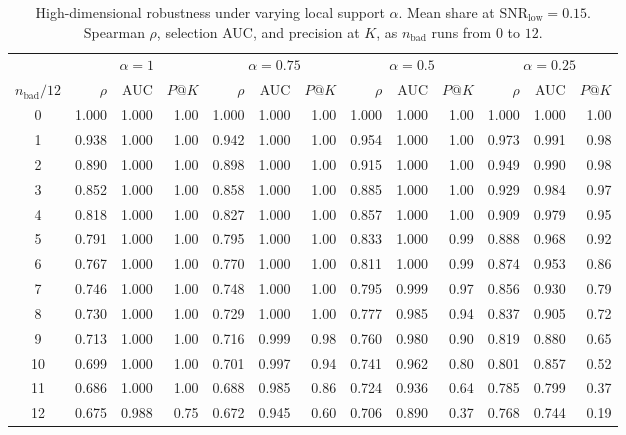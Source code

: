 \begin{table}[t]
\centering
\caption{High-dimensional robustness under varying local support \(\alpha\).
Mean share at \(\mathrm{SNR}_{\mathrm{low}}=0.15\).
Spearman \(\rho\), selection AUC, and precision at \(K\), as
\(n_{\mathrm{bad}}\) runs from \(0\) to \(12\).}
\label{tab:federated_highdim}
\footnotesize
\setlength{\tabcolsep}{3pt}
\begin{tabular}{c rrr rrr rrr rrr}
\toprule
 & \multicolumn{3}{c}{\(\alpha = 1\)} & \multicolumn{3}{c}{\(\alpha = 0.75\)} & \multicolumn{3}{c}{\(\alpha = 0.5\)} & \multicolumn{3}{c}{\(\alpha = 0.25\)} \\
\cmidrule(lr){2-4} \cmidrule(lr){5-7} \cmidrule(lr){8-10} \cmidrule(lr){11-13}
\(n_{\mathrm{bad}}/12\) & \(\rho\) & AUC & \(P@K\) & \(\rho\) & AUC & \(P@K\) & \(\rho\) & AUC & \(P@K\) & \(\rho\) & AUC & \(P@K\) \\
\midrule
0  & 1.000 & 1.000 & 1.00 & 1.000 & 1.000 & 1.00 & 1.000 & 1.000 & 1.00 & 1.000 & 1.000 & 1.00 \\
1  & 0.938 & 1.000 & 1.00 & 0.942 & 1.000 & 1.00 & 0.954 & 1.000 & 1.00 & 0.973 & 0.991 & 0.98 \\
2  & 0.890 & 1.000 & 1.00 & 0.898 & 1.000 & 1.00 & 0.915 & 1.000 & 1.00 & 0.949 & 0.990 & 0.98 \\
3  & 0.852 & 1.000 & 1.00 & 0.858 & 1.000 & 1.00 & 0.885 & 1.000 & 1.00 & 0.929 & 0.984 & 0.97 \\
4  & 0.818 & 1.000 & 1.00 & 0.827 & 1.000 & 1.00 & 0.857 & 1.000 & 1.00 & 0.909 & 0.979 & 0.95 \\
5  & 0.791 & 1.000 & 1.00 & 0.795 & 1.000 & 1.00 & 0.833 & 1.000 & 0.99 & 0.888 & 0.968 & 0.92 \\
6  & 0.767 & 1.000 & 1.00 & 0.770 & 1.000 & 1.00 & 0.811 & 1.000 & 0.99 & 0.874 & 0.953 & 0.86 \\
7  & 0.746 & 1.000 & 1.00 & 0.748 & 1.000 & 1.00 & 0.795 & 0.999 & 0.97 & 0.856 & 0.930 & 0.79 \\
8  & 0.730 & 1.000 & 1.00 & 0.729 & 1.000 & 1.00 & 0.777 & 0.985 & 0.94 & 0.837 & 0.905 & 0.72 \\
9  & 0.713 & 1.000 & 1.00 & 0.716 & 0.999 & 0.98 & 0.760 & 0.980 & 0.90 & 0.819 & 0.880 & 0.65 \\
10 & 0.699 & 1.000 & 1.00 & 0.701 & 0.997 & 0.94 & 0.741 & 0.962 & 0.80 & 0.801 & 0.857 & 0.52 \\
11 & 0.686 & 1.000 & 1.00 & 0.688 & 0.985 & 0.86 & 0.724 & 0.936 & 0.64 & 0.785 & 0.799 & 0.37 \\
12 & 0.675 & 0.988 & 0.75 & 0.672 & 0.945 & 0.60 & 0.706 & 0.890 & 0.37 & 0.768 & 0.744 & 0.19 \\
\bottomrule
\end{tabular}
\end{table}

